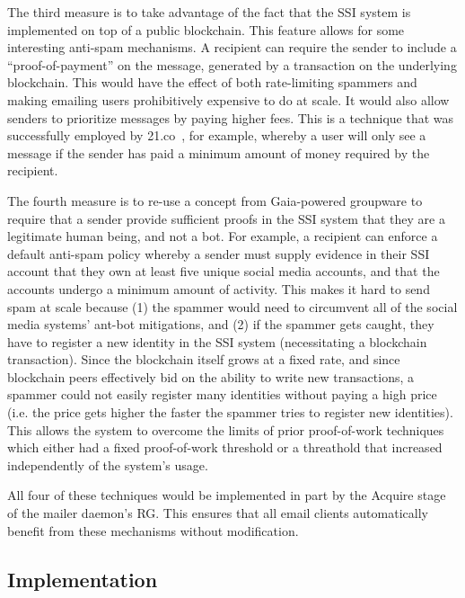 \hfill \break
{}
\hfill \break

The third measure is to take advantage of the fact that the SSI system is implemented on top of
a public blockchain.  This feature allows for some interesting anti-spam mechanisms.  A recipient can require the sender
to include a ``proof-of-payment'' on the message, generated by a transaction on the
underlying blockchain.  This would have the effect of both rate-limiting
spammers and making emailing users prohibitively expensive to do at scale.  It
would also allow senders to prioritize messages by paying higher fees. This
is a technique that was successfully employed by
21.co~\cite{21co-messaging}, for example, whereby a user will only see a
message if the sender has paid a minimum amount of money required by the
recipient.

\hfill \break
{}
\hfill \break

The fourth measure is to re-use a concept from Gaia-powered groupware to require
that a sender provide sufficient proofs in the SSI system that they are a
legitimate human being, and not a bot.  For example, a recipient can enforce a
default anti-spam policy whereby a sender must supply evidence in their SSI
account that they own at least five unique social media accounts, and that the
accounts undergo a minimum amount of activity.  This makes it hard to send
spam at scale because (1) the spammer would need to circumvent all of the social
media systems' ant-bot mitigations, and (2) if the spammer gets caught, they
have to register a new identity in the SSI system (necessitating a blockchain
transaction).  Since the blockchain itself grows at a fixed rate, and since
blockchain peers effectively bid on the ability to write new transactions, a
spammer could not easily register many identities without paying a high price
(i.e. the price gets higher the faster the spammer tries to register new
identities).  This allows the system to overcome the limits of prior proof-of-work
techniques~\cite{anti-spam-proof-of-work} which either had a fixed proof-of-work
threshold or a threathold that increased independently of the system's usage.

All four of these techniques would be implemented in part by the Acquire stage of the
mailer daemon's RG.  This ensures that all email clients automatically benefit
from these mechanisms without modification.

\subsection{Implementation}

